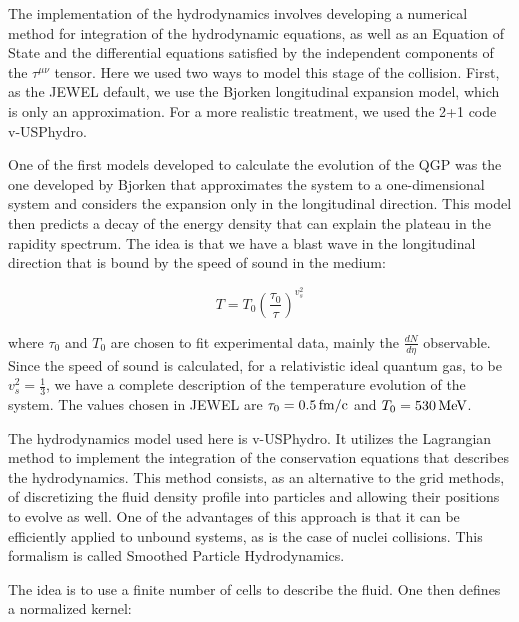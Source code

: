  \label{hydro}

The implementation of the hydrodynamics involves developing a numerical method for integration of the hydrodynamic equations, as well as an Equation of State and the differential equations satisfied by the independent components of the $\tau^{\mu \nu}$ tensor. Here we used two ways to model this stage of the collision. First, as the JEWEL default, we use the Bjorken longitudinal expansion model, which is only an approximation. For a more realistic treatment, we used the 2+1 code v-USPhydro.

 \label{bjorken}

One of the first models developed to calculate the evolution of the QGP was the one developed by Bjorken that approximates the system to a one-dimensional system and considers the expansion only in the longitudinal direction. This model then predicts a decay of the energy density that can explain the plateau in the rapidity spectrum. The idea is that we have a blast wave in the longitudinal direction that is bound by the speed of sound in the medium:

\begin{equation}
T = T_0 \left( \frac{\tau_0}{\tau} \right)^{v_s^2}
\end{equation}

where $\tau_0$ and $T_0$ are chosen to fit experimental data, mainly the $\frac{dN}{d\eta}$ observable. Since the speed of sound is calculated, for a relativistic ideal quantum gas, to be $v_s^2=\frac{1}{3}$, we have a complete description of the temperature evolution of the system. The values chosen in JEWEL\cite{zapp_perturbative_2013} are $\tau_0=0.5 \, {\rm fm/c}$ and $T_0=530 \, {\rm MeV}$.

 \label{vusp}

The hydrodynamics model used here is v-USPhydro\cite{noronha-hostler_bulk_2014,noronha-hostler_bulk_2013,noauthor_jacquelyn_nodate}. It utilizes the Lagrangian method to implement the integration of the conservation equations that describes the hydrodynamics. This method consists, as an alternative to the grid methods, of discretizing the fluid density profile into particles and allowing their positions to evolve as well. One of the advantages of this approach is that it can be efficiently applied to unbound systems, as is the case of nuclei collisions. This formalism is called Smoothed Particle Hydrodynamics.
\par
The idea is to use a finite number of cells to describe the fluid. One then defines a normalized kernel:

